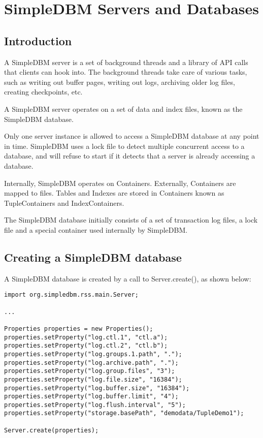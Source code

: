 \documentclass[a4paper,draft,oneside]{book}
\begin{document}
\chapter{SimpleDBM Servers and Databases}

\section{Introduction}

A SimpleDBM server is a set of background threads and a library of API
calls that clients can hook into. The background threads take care of
various tasks, such as writing out buffer pages, writing out logs,
archiving older log files, creating checkpoints, etc.

A SimpleDBM server operates on a set of data and index files, known as
the SimpleDBM database.

Only one server instance is allowed to access a SimpleDBM database at
any point in time. SimpleDBM uses a lock file to detect multiple
concurrent access to a database, and will refuse to start if it
detects that a server is already accessing a database.

Internally, SimpleDBM operates on Containers. Externally, Containers
are mapped to files. Tables and Indexes are stored in Containers known
as TupleContainers and IndexContainers.

The SimpleDBM database initially consists of a set of transaction log
files, a lock file and a special container used internally by
SimpleDBM.

\section{Creating a SimpleDBM database}

A SimpleDBM database is created by a call to Server.create(), as shown
below:

\begin{verbatim}
import org.simpledbm.rss.main.Server;

...

Properties properties = new Properties();
properties.setProperty("log.ctl.1", "ctl.a");
properties.setProperty("log.ctl.2", "ctl.b");
properties.setProperty("log.groups.1.path", ".");
properties.setProperty("log.archive.path", ".");
properties.setProperty("log.group.files", "3");
properties.setProperty("log.file.size", "16384");
properties.setProperty("log.buffer.size", "16384");
properties.setProperty("log.buffer.limit", "4");
properties.setProperty("log.flush.interval", "5");
properties.setProperty("storage.basePath", "demodata/TupleDemo1");

Server.create(properties);
\end{verbatim}
\end{document}
